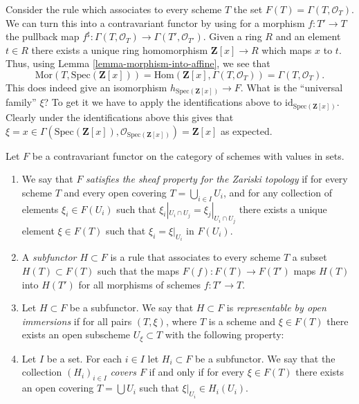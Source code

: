 \begin{example}
\label{example-global-sections}
Consider the rule which associates to every scheme $T$ the set
$F(T) = \Gamma(T, \mathcal{O}_T)$. We can turn this into a contravariant
functor by using for a morphism $f : T' \to T$ the pullback map
$f^\sharp : \Gamma(T, \mathcal{O}_T) \to \Gamma(T', \mathcal{O}_{T'})$.
Given a ring $R$ and an element $t \in R$ there exists a unique
ring homomorphism $\mathbf{Z}[x] \to R$ which maps $x$ to $t$.
Thus, using Lemma \ref{lemma-morphism-into-affine}, we see that
$$
\text{Mor}(T, \text{Spec}(\mathbf{Z}[x])) =
\text{Hom}(\mathbf{Z}[x], \Gamma(T, \mathcal{O}_T)) =
\Gamma(T, \mathcal{O}_T).
$$
This does indeed
give an isomorphism $h_{\text{Spec}(\mathbf{Z}[x])} \to F$.
What is the ``universal family'' $\xi$? To get it we have to
apply the identifications above to $\text{id}_{\text{Spec}(\mathbf{Z}[x])}$.
Clearly under the identifications above this gives
that
$\xi = x \in \Gamma(\text{Spec}(\mathbf{Z}[x]),
\mathcal{O}_{\text{Spec}(\mathbf{Z}[x])}) = \mathbf{Z}[x]$
as expected.
\end{example}

\begin{definition}
\label{definition-representable-by-open-immersions}
Let $F$ be a contravariant functor on the category
of schemes with values in sets. 
\begin{enumerate}
\item We say that $F$ {\it satisfies the sheaf property for the
Zariski topology} if for every scheme $T$ and every open covering
$T = \bigcup_{i \in I} U_i$, and for any collection of elements
$\xi_i \in F(U_i)$ such that $\xi_i|_{U_i \cap U_j} =
\xi_j|_{U_i \cap U_j}$ there exists a unique element
$\xi \in F(T)$ such that $\xi_i = \xi|_{U_i}$ in $F(U_i)$.
\item A {\it subfunctor $H \subset F$} is a rule that associates
to every scheme $T$ a subset $H(T) \subset F(T)$ such that
the maps $F(f) : F(T) \to F(T')$ maps $H(T)$ into
$H(T')$ for all morphisms of schemes $f : T' \to T$.
\item Let $H \subset F$ be a subfunctor. We say that
$H \subset F$ is {\it representable by open immersions}
if for all pairs $(T, \xi)$, where $T$ is a scheme and $\xi \in F(T)$
there exists an open subscheme $U_\xi \subset T$ with the following
property:
\item Let $I$ be a set. For each $i \in I$ let $H_i \subset F$
be a subfunctor. We say that the collection $(H_i)_{i \in I}$
{\it covers $F$} if and only if for every $\xi \in F(T)$
there exists an open covering $T = \bigcup U_i$ such that
$\xi|_{U_i} \in H_i(U_i)$.
\end{enumerate}
\end{definition}


